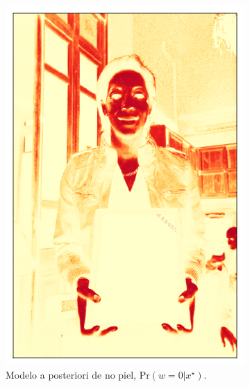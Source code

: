 \begin{figure}[ht!]
\begin{subfigure}[t]{0.2\textwidth}
        \includegraphics[width=\textwidth]{../figures/image2/image_02_postbg.png}
        \caption{Modelo a posteriori de no piel, $\text{Pr}(w=0 | x^{\star})$.}
    \end{subfigure}
    \begin{subfigure}[t]{0.2\textwidth}
        \centering

\end{subfigure}
\end{figure}

